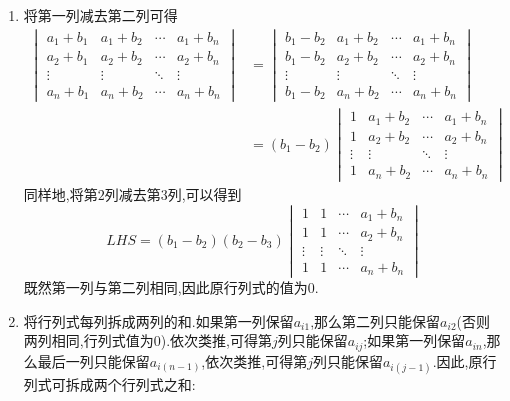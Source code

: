 \documentclass{ctexart}
\begin{document}
\begin{solution}
    \begin{enumerate}[label=\tbf{\arabic*}.,topsep=0pt,parsep=0pt,itemsep=0pt,partopsep=0pt]
        \item 将第一列减去第二列可得
            \[\begin{aligned}
                \begin{vmatrix}
                    a_1+b_1&a_1+b_2&\cdots&a_1+b_n\\
                    a_2+b_1&a_2+b_2&\cdots&a_2+b_n\\
                    \vdots&\vdots&\ddots&\vdots\\
                    a_n+b_1&a_n+b_2&\cdots&a_n+b_n
                \end{vmatrix}
                &=
                \begin{vmatrix}
                    b_1-b_2&a_1+b_2&\cdots&a_1+b_n\\
                    b_1-b_2&a_2+b_2&\cdots&a_2+b_n\\
                    \vdots&\vdots&\ddots&\vdots\\
                    b_1-b_2&a_n+b_2&\cdots&a_n+b_n
                \end{vmatrix}\\
                &=\left(b_1-b_2\right)
                \begin{vmatrix}
                    1&a_1+b_2&\cdots&a_1+b_n\\
                    1&a_2+b_2&\cdots&a_2+b_n\\
                    \vdots&\vdots&\ddots&\vdots\\
                    1&a_n+b_2&\cdots&a_n+b_n
                \end{vmatrix}
            \end{aligned}\]
            同样地,将第$2$列减去第$3$列,可以得到
            \[LHS=\left(b_1-b_2\right)\left(b_2-b_3\right)\begin{vmatrix}
                1&1&\cdots&a_1+b_n\\
                1&1&\cdots&a_2+b_n\\
                \vdots&\vdots&\ddots&\vdots\\
                1&1&\cdots&a_n+b_n
            \end{vmatrix}\]
            既然第一列与第二列相同,因此原行列式的值为$0$.
        \item 将行列式每列拆成两列的和.如果第一列保留$a_{i1}$,那么第二列只能保留$a_{i2}$(否则两列相同,行列式值为$0$).依次类推,可得第$j$列只能保留$a_{ij}$;如果第一列保留$a_{in}$,那么最后一列只能保留$a_{i(n-1)}$,依次类推,可得第$j$列只能保留$a_{i(j-1)}$.因此,原行列式可拆成两个行列式之和:

\end{enumerate}
\end{solution}
\end{document}
